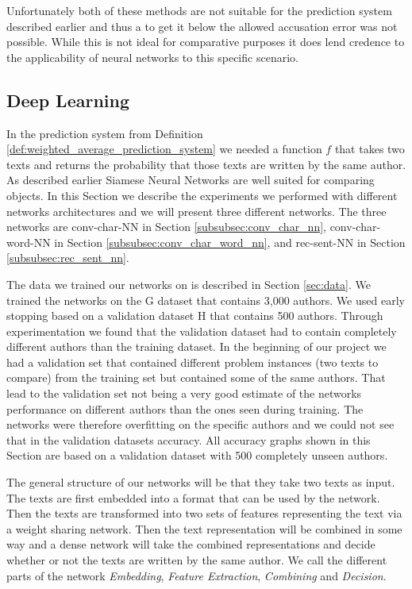 Unfortunately both of these methods are not suitable for the prediction system
described earlier and thus a to get it below the allowed accusation error was
not possible. While this is not ideal for comparative purposes it does lend
credence to the applicability of neural networks to this specific scenario.


\subsection{Deep Learning}

In the prediction system from Definition
\ref{def:weighted_average_prediction_system} we needed a function $f$ that
takes two texts and returns the probability that those texts are written
by the same author. As described earlier Siamese Neural Networks are well
suited for comparing objects. In this Section we describe the experiments
we performed with different networks architectures and we will present
three different networks. The three networks are \gls{conv-char-NN} in
Section \ref{subsubsec:conv_char_nn}, \gls{conv-char-word-NN} in Section
\ref{subsubsec:conv_char_word_nn}, and \gls{rec-sent-NN} in Section
\ref{subsubsec:rec_sent_nn}.

The data we trained our networks on is described in Section \ref{sec:data}. We
trained the networks on the \gls{G} dataset that contains 3,000 authors. We used
early stopping based on a validation dataset \gls{H} that contains 500 authors.
Through experimentation we found that the validation dataset had to contain
completely different authors than the training dataset. In the beginning of
our project we had a validation set that contained different problem instances
(two texts to compare) from the training set but contained some of the same
authors. That lead to the validation set not being a very good estimate of the
networks performance on different authors than the ones seen during training.
The networks were therefore overfitting on the specific authors and we could not
see that in the validation datasets accuracy. All accuracy graphs shown in this
Section are based on a validation dataset with 500 completely unseen authors.

The general structure of our networks will be that they take two texts as input.
The texts are first embedded into a format that can be used by the network.
Then the texts are transformed into two sets of features representing the text
via a weight sharing network. Then the text representation will be combined
in some way and a dense network will take the combined representations and
decide whether or not the texts are written by the same author. We call the
different parts of the network \textit{Embedding}, \textit{Feature Extraction},
\textit{Combining} and \textit{Decision}.

